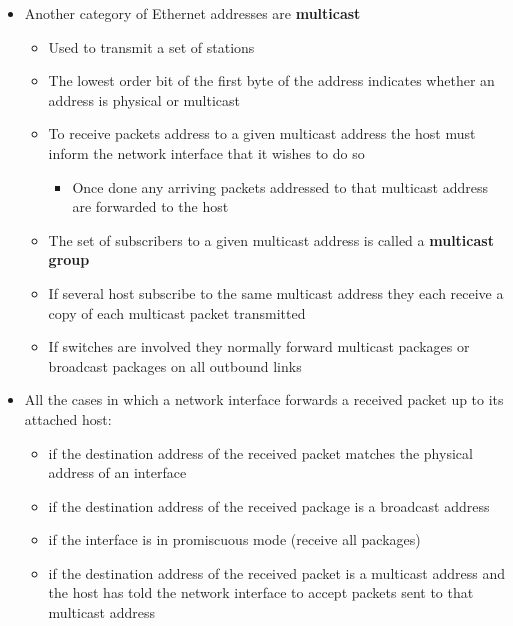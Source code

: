\documentclass[11pt]{article}
\providecommand{\tightlist}{%
      \setlength{\itemsep}{0pt}\setlength{\parskip}{0pt}}
\begin{document}
\begin{itemize}
\tightlist
\item
  Another category of Ethernet addresses are \textbf{multicast}

  \begin{itemize}
  \tightlist
  \item
    Used to transmit a set of stations
  \item
    The lowest order bit of the first byte of the address indicates
    whether an address is physical or multicast
  \item
    To receive packets address to a given multicast address the host
    must inform the network interface that it wishes to do so

    \begin{itemize}
    \tightlist
    \item
      Once done any arriving packets addressed to that multicast address
      are forwarded to the host
    \end{itemize}
  \item
    The set of subscribers to a given multicast address is called a
    \textbf{multicast group}
  \item
    If several host subscribe to the same multicast address they each
    receive a copy of each multicast packet transmitted
  \item
    If switches are involved they normally forward multicast packages or
    broadcast packages on all outbound links
  \end{itemize}
\item
  All the cases in which a network interface forwards a received packet
  up to its attached host:

  \begin{itemize}
  \tightlist
  \item
    if the destination address of the received packet matches the
    physical address of an interface
  \item
    if the destination address of the received package is a broadcast
    address
  \item
    if the interface is in promiscuous mode (receive all packages)
  \item
    if the destination address of the received packet is a multicast
    address and the host has told the network interface to accept
    packets sent to that multicast address
  \end{itemize}
\end{itemize}
\end{document}
